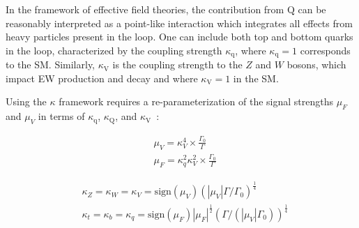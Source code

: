 In the framework of effective field theories, the contribution from $\mathrm{Q}$ can be reasonably interpreted as a point-like interaction which integrates all effects from heavy particles present in the loop.
One can include both top and bottom quarks in the loop, characterized by the coupling strength $\kappa_\mathrm{q}$, 
where $\kappa_\mathrm{q}=1$ corresponds to the SM. Similarly, $\kappa_\mathrm{V}$ is the \Hboson coupling strength to the $Z$ and $W$ bosons, which impact EW production and \Hboson decay and where $\kappa_\mathrm{V}=1$ in the SM. 

Using the $\kappa$ framework requires a re-parameterization of the signal strengths $\mu_F$ and $\mu_V$
in terms of $\kappa_\mathrm{q}$, $\kappa_\mathrm{Q}$, and $\kappa_\mathrm{V}$~\cite{Davis:2021tiv}:

\begin{equation}
\begin{aligned}
& \mu_V=\kappa_V^4\times\frac{\Gamma_0}{\Gamma} \\
& \mu_F=\kappa_q^2\kappa_V^2\times\frac{\Gamma_0}{\Gamma}
\end{aligned}
\label{eq:KappaMu}
\end{equation}

\begin{equation}
\begin{aligned}
& \kappa_Z = \kappa_W = \kappa_V= \mathrm{sign}(\mu_V)\left(|\mu_V|\Gamma/\Gamma_0\right)^\frac{1}{4} \\
& \kappa_t = \kappa_b = \kappa_q= \mathrm{sign}(\mu_F)|\mu_F|^\frac{1}{2} \left(\Gamma/(|\mu_V|\Gamma_0)\right)^\frac{1}{4}
\end{aligned}
\label{eq:KappaMu2}
\end{equation}


